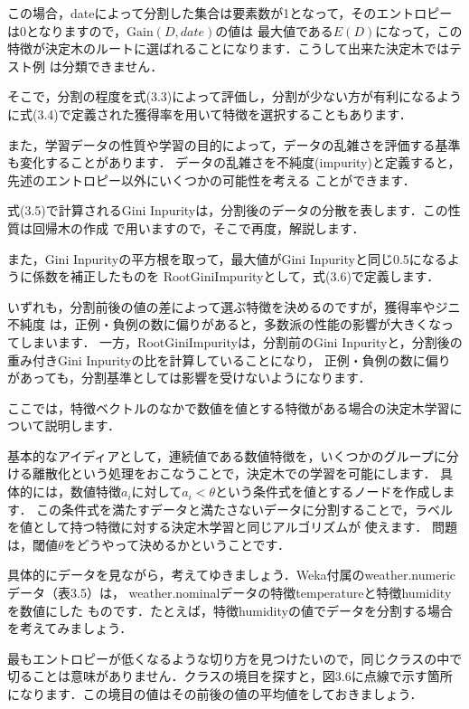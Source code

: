 この場合，dateによって分割した集合は要素数が1となって，そのエントロピーは0となりますので，$\mbox{Gain}(D, date)$の値は
最大値である$E(D)$になって，この特徴が決定木のルートに選ばれることになります．こうして出来た決定木ではテスト例
は分類できません．

そこで，分割の程度を式(3.3)によって評価し，分割が少ない方が有利になるように式(3.4)で定義された獲得率を用いて特徴を選択することもあります．

また，学習データの性質や学習の目的によって，データの乱雑さを評価する基準も変化することがあります．
データの乱雑さを不純度(impurity)と定義すると，先述のエントロピー以外にいくつかの可能性を考える
ことができます．

式(3.5)で計算されるGini Inpurityは，分割後のデータの分散を表します．この性質は回帰木の作成
で用いますので，そこで再度，解説します．

また，Gini Inpurityの平方根を取って，最大値がGini Inpurityと同じ0.5になるように係数を補正したものを
RootGiniImpurityとして，式(3.6)で定義します．

いずれも，分割前後の値の差によって選ぶ特徴を決めるのですが，獲得率やジニ不純度
は，正例・負例の数に偏りがあると，多数派の性能の影響が大きくなってしまいます．
一方，RootGiniImpurityは，分割前のGini Inpurityと，分割後の重み付きGini Inpurityの比を計算していることになり，
正例・負例の数に偏りがあっても，分割基準としては影響を受けないようになります．


ここでは，特徴ベクトルのなかで数値を値とする特徴がある場合の決定木学習について説明します．

基本的なアイディアとして，連続値である数値特徴を，いくつかのグループに分ける離散化という処理をおこなうことで，決定木での学習を可能にします．
具体的には，数値特徴$a_i$に対して$a_i < \theta$という条件式を値とするノードを作成します．
この条件式を満たすデータと満たさないデータに分割することで，ラベルを値として持つ特徴に対する決定木学習と同じアルゴリズムが
使えます．
問題は，閾値$\theta$をどうやって決めるかということです．

具体的にデータを見ながら，考えてゆきましょう．Weka付属のweather.numericデータ（表3.5）は，
weather.nominalデータの特徴temperatureと特徴humidityを数値にした
ものです．たとえば，特徴humidityの値でデータを分割する場合を考えてみましょう．

最もエントロピーが低くなるような切り方を見つけたいので，同じクラスの中で切ることは意味がありません．クラスの境目を探すと，図3.6に点線で示す箇所になります．この境目の値はその前後の値の平均値をしておきましょう．


